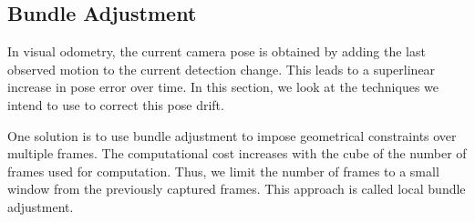 \documentclass[12pt,twocolumn,letterpaper]{article}
\begin{document}
\subsection{Bundle Adjustment}
In visual odometry, the current camera pose is obtained by adding the last observed motion to the current detection change. This leads to a superlinear increase in pose error over time. In this section, we look at the techniques we intend to use to correct this pose drift.

One solution is to use bundle adjustment to impose geometrical constraints over multiple
frames. The computational cost increases with the cube of the number of frames used for computation. Thus, we limit the number of frames to a small window from the previously captured frames. This approach is called local bundle adjustment.
\end{document}
